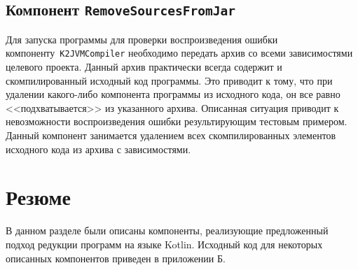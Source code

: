 \subsection{Компонент \texttt{RemoveSourcesFromJar}}
Для запуска программы для проверки воспроизведения ошибки компоненту~\texttt{K2JVMCompiler} необходимо передать архив со всеми зависимостями целевого проекта. Данный архив практически всегда содержит и скомпилированный исходный код программы. Это приводит к тому, что при удалении какого-либо компонента программы из исходного кода, он все равно <<подхватывается>> из указанного архива. Описанная ситуация приводит к невозможности воспроизведения ошибки результирующим тестовым примером. Данный компонент занимается удалением всех скомпилированных элементов исходного кода из архива с зависимостями.

\section{Резюме}
В данном разделе были описаны компоненты, реализующие предложенный подход редукции программ на языке Kotlin. Исходный код для некоторых описанных компонентов приведен в приложении Б.